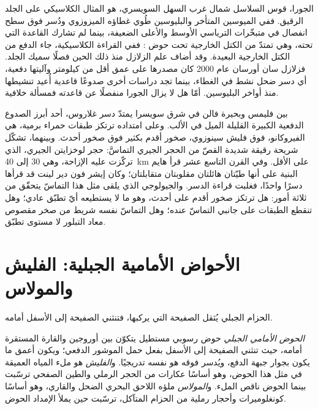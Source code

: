 الجورا، قوس السلاسل شمال غرب السهل السويسري، هو المثال الكلاسيكي على الجلد
الرقيق. ففي الميوسين المتأخر والبليوسين طُوي غطاؤه الميزوزوي ودُسر فوق
سطح انفصال في متبخّرات الترياسي الأوسط والأعلى الضعيفة، بينما لم تشارك القاعدة التي تحته،
وهي تمتدّ من الكتل الخارجية تحت حوض : ففي
القراءة الكلاسيكية، جاء الدفع من الكتل الخارجية البعيدة. وقد أضاف علم الزلازل منذ ذلك الحين
فصلًا سميك الجلد. فزلازل سان أورسان عام 2000 كان مصدرها
على عمق أقل من كيلومتر وآليتها دفعية، أي دسر ضحل نشط في الغطاء،
بينما تجد دراسات أخرى صدوعًا قاعدية أُعيد تنشيطها منذ أواخر البليوسين. أمّا
هل لا يزال الجورا منفصلًا عن قاعدته فمسألة خلافية.

\begin{inthefield}
بين فليمس وبحيرة فالن في شرق سويسرا يمتدّ دسر غلاروس، أحد
أبرز الصدوع الدفعية الكبيرة القليلة الميل في الألب. وعلى امتداده ترتكز طبقات حمراء برمية، هي
الفيروكانو، فوق فليش سينوزوي، صخور أقدم بكثير فوق صخور أحدث. وبينهما، تشكّل
شريحة رقيقة شديدة القصّ من الحجر الجيري التماسَّ: حجر لوخزايتن الجيري، الذي تركّزت عليه الإزاحة، وهي 30 إلى
\qty{40}{km} على الأقل. وفي القرن التاسع عشر قرأ هايم البنية على أنها طيّتان هائلتان
مقلوبتان متقابلتان؛ وكان إيشر فون دير لينت قد قرأها دسرًا واحدًا، فغلبت قراءة الدسر. والجيولوجي الذي يلقى مثل هذا التماسّ يتحقّق من
ثلاثة أمور: هل ترتكز صخور أقدم على أحدث، وهو ما لا يستطيعه أيّ تطبّق عادي؛
وهل تنقطع الطبقات على جانبي التماسّ عنده؛ وهل التماسّ
نفسه شريط من صخر مقصوص معاد التبلور لا مستوى تطبّق.
\end{inthefield}

\section{الأحواض الأمامية الجبلية: الفليش والمولاس}\label{sec:b2:alpine-orogen:foreland}

الحزام الجبلي يُثقل الصفيحة التي يركبها، فتنثني الصفيحة إلى الأسفل أمامه.

\begin{definition}\label{def:b2:alpine-orogen:foreland}
\emph{الحوض الأمامي الجبلي} حوض رسوبي مستطيل يتكوّن
بين أوروجين والقارة المستقرة أمامه، حيث تنثني الصفيحة إلى الأسفل بفعل
حمل الموشور الدفعي؛ ويكون أعمق ما يكون بجوار جبهة الدفع، ويُدسر فوقه هو نفسه
تدريجيًا. و\emph{الفليش} هو ملء المياه العميقة في مثل هذا
الحوض، وهو أساسًا عكارات من الحجر الرملي والطين الصفحي ترسّبت بينما الحوض ناقص الملء.
و\emph{المولاس} ملؤه اللاحق البحري الضحل والقاري، وهو أساسًا
كونغلوميرات وأحجار رملية من الحزام المتآكل، ترسّبت حين يملأ الإمداد
الحوض.
\end{definition}

